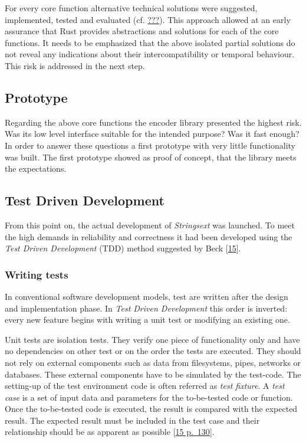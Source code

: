 For every core function alternative technical solutions were suggested,
implemented, tested and evaluated (cf.
\protect\hyperlink{_analysis_and_design}{???}). This approach allowed at
an early assurance that Rust provides abstractions and solutions for
each of the core functions. It needs to be emphasized that the above
isolated partial solutions do not reveal any indications about their
intercompatibility or temporal behaviour. This risk is addressed in the
next step.

\subsection{Prototype}\label{_prototype}

Regarding the above core functions the encoder library presented the
highest risk. Was its low level interface suitable for the intended
purpose? Was it fast enough? In order to answer these questions a first
prototype with very little functionality was built. The first prototype
showed as proof of concept, that the library meets the expectations.

\hypertarget{_test_driven_development}{\subsection{Test Driven
Development}\label{_test_driven_development}}

From this point on, the actual development of \emph{Strings­ext} was
launched. To meet the high demands in reliability and correctness it had
been developed using the \emph{Test Driven Development} (TDD) method
suggested by Beck {[}\protect\hyperlink{beck2003}{15}{]}.

\subsubsection{Writing tests}\label{_writing_tests}

In conventional software development models, test are written after the
design and implementation phase. In \emph{Test Driven Development} this
order is inverted: every new feature begins with writing a unit test or
modifying an existing one.

Unit tests are isolation tests. They verify one piece of functionality
only and have no dependencies on other test or on the order the tests
are executed. They should not rely on external components such as data
from filesystems, pipes, networks or databases. These external
components have to be simulated by the test-code. The setting-up of the
test environment code is often referred as \emph{test fixture}. A
\emph{test case} is a set of input data and parameters for the
to-be-tested code or function. Once the to-be-tested code is executed,
the result is compared with the expected result. The expected result
must be included in the test case and their relationship should be as
apparent as possible {[}\protect\hyperlink{beck2003}{15 p.~130}{]}.

